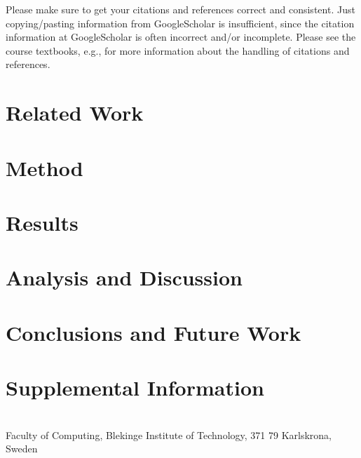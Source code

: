 \documentclass[a4paper,twoside]{bth}
\newcommand{\faculty}{Computing}
\begin{document}
Please make sure to get your citations and references correct and consistent.
Just copying/pasting information from GoogleScholar is insufficient,
since the citation information at GoogleScholar is often incorrect and/or incomplete.
Please see the course textbooks, e.g., \cite{berndtsson2007thesis,evans2014write,zobel2014writing}
for more information about the handling of citations and references.



\chapter{Related Work}


\chapter{Method}


\chapter{Results}


\chapter{Analysis and Discussion}


\chapter{Conclusions and Future Work}





\appendix
\chapter{Supplemental Information}


\cleardoublepage
\thispagestyle{empty}
\vspace*{\fill}
\clearpage{\thispagestyle{empty}}
\changepage{3cm}{1cm}{-0.5cm}{-0.5cm}{}{-1.5cm}{}{}{}
\vspace*{\fill}
\center

{\bthcsnotextlogo{3cm}}
\\
\noindent\makebox[\linewidth]{\rule{\textwidth}{1pt}}
Faculty of \faculty, Blekinge Institute of Technology, 371 79 Karlskrona, Sweden
\end{document}
